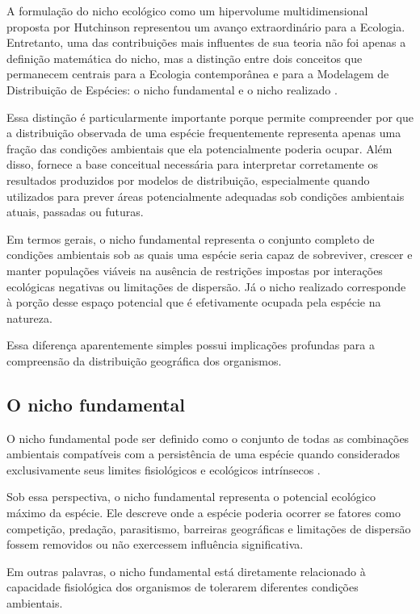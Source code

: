 A formulação do nicho ecológico como um hipervolume multidimensional proposta por Hutchinson representou um avanço extraordinário para a Ecologia. Entretanto, uma das contribuições mais influentes de sua teoria não foi apenas a definição matemática do nicho, mas a distinção entre dois conceitos que permanecem centrais para a Ecologia contemporânea e para a Modelagem de Distribuição de Espécies: o nicho fundamental e o nicho realizado \parencite{hutchinson1957}.

Essa distinção é particularmente importante porque permite compreender por que a distribuição observada de uma espécie frequentemente representa apenas uma fração das condições ambientais que ela potencialmente poderia ocupar. Além disso, fornece a base conceitual necessária para interpretar corretamente os resultados produzidos por modelos de distribuição, especialmente quando utilizados para prever áreas potencialmente adequadas sob condições ambientais atuais, passadas ou futuras.

Em termos gerais, o nicho fundamental representa o conjunto completo de condições ambientais sob as quais uma espécie seria capaz de sobreviver, crescer e manter populações viáveis na ausência de restrições impostas por interações ecológicas negativas ou limitações de dispersão. Já o nicho realizado corresponde à porção desse espaço potencial que é efetivamente ocupada pela espécie na natureza.

Essa diferença aparentemente simples possui implicações profundas para a compreensão da distribuição geográfica dos organismos.

\subsection{O nicho fundamental}

O nicho fundamental pode ser definido como o conjunto de todas as combinações ambientais compatíveis com a persistência de uma espécie quando considerados exclusivamente seus limites fisiológicos e ecológicos intrínsecos \parencite{hutchinson1957,pulliam2000}.

Sob essa perspectiva, o nicho fundamental representa o potencial ecológico máximo da espécie. Ele descreve onde a espécie poderia ocorrer se fatores como competição, predação, parasitismo, barreiras geográficas e limitações de dispersão fossem removidos ou não exercessem influência significativa.

Em outras palavras, o nicho fundamental está diretamente relacionado à capacidade fisiológica dos organismos de tolerarem diferentes condições ambientais.

